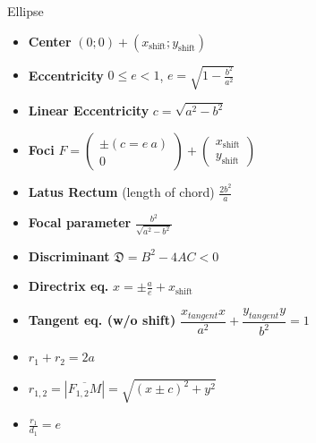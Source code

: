 \documentclass[aspectratio=169]{beamer}
\newcommand{\shf}{\text{shift}}
\begin{document}
\begin{frame}[t]{Ellipse}
\begin{multicols}{3}
\begin{itemize}
                \item \textbf{Center} $(0;0) + (x_{\shf};y_{\shf})$
                \item \textbf{Eccentricity} $0 \leq e < 1$, $e = \sqrt{1 - \frac{b^2}{a^2}}$
                \item \textbf{Linear Eccentricity} $c = \sqrt{a^2-b^2}$
                \item \textbf{Foci} $F = \begin{pmatrix} \pm(c= e\ a)\\ 0 \end{pmatrix} + \begin{pmatrix} x_{\shf}\\y_{\shf} \end{pmatrix}$
                \item \textbf{Latus Rectum} (length of chord) $\frac{2b^2}{a}$
                \item \textbf{Focal parameter}  $\frac{b^2}{\sqrt{a^2-b^2}}$
                \item \textbf{Discriminant} $\mathfrak{D} = B^2 - 4AC < 0$
                \item \textbf{Directrix eq.} $x = \pm \frac{a}{e} + x_{\shf}$
                \item \textbf{Tangent eq. (w/o shift)} $\dfrac{x_{tangent} x}{a^2}+\dfrac{y_{tangent} y}{b^2}=1$
                \item $r_1 + r_2 = 2a$
                \item $r_{1,2} = |\overline{F_{1,2}M}|=\sqrt{(x \pm c)^2+y^2}$
                \item $\frac{r_1}{d_1}=e$
                \end{itemize}
        \end{multicols}
        \end{frame}
\end{document}
